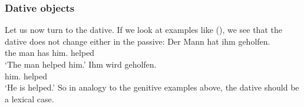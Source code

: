 \subsubsection{Dative objects}
\label{sec-dative-objects-tructurl-lexical}

Let us now turn to the dative. If we look at examples like (), we see that the dative does not
change either in the passive:
\eal
\ex 
\gll Der Mann hat ihm geholfen.\\
     the\NOM{} man  has him.\DAT{} helped\\
\glt `The man helped him.'
\ex 
\gll Ihm        wird geholfen.\\
     him.\DAT{} \AUX{} helped\\
\glt `He is helped.'
\zl
So in analogy to the genitive examples above, the dative should be a lexical case.

